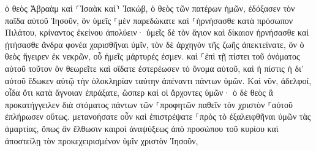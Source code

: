 \documentclass{openreader}
\begin{document}
ὁ θεὸς Ἀβραὰμ καὶ ⸂Ἰσαὰκ καὶ⸃ Ἰακώβ, ὁ θεὸς τῶν πατέρων ἡμῶν, ἐδόξασεν τὸν παῖδα αὐτοῦ Ἰησοῦν, ὃν ὑμεῖς ⸀μὲν παρεδώκατε καὶ ⸀ἠρνήσασθε κατὰ πρόσωπον Πιλάτου, κρίναντος ἐκείνου ἀπολύειν· 
ὑμεῖς δὲ τὸν ἅγιον καὶ δίκαιον ἠρνήσασθε καὶ ᾐτήσασθε ἄνδρα φονέα χαρισθῆναι ὑμῖν, 
τὸν δὲ ἀρχηγὸν τῆς ζωῆς ἀπεκτείνατε, ὃν ὁ θεὸς ἤγειρεν ἐκ νεκρῶν, οὗ ἡμεῖς μάρτυρές ἐσμεν. 
καὶ ⸀ἐπὶ τῇ πίστει τοῦ ὀνόματος αὐτοῦ τοῦτον ὃν θεωρεῖτε καὶ οἴδατε ἐστερέωσεν τὸ ὄνομα αὐτοῦ, καὶ ἡ πίστις ἡ δι’ αὐτοῦ ἔδωκεν αὐτῷ τὴν ὁλοκληρίαν ταύτην ἀπέναντι πάντων ὑμῶν. 
Καὶ νῦν, ἀδελφοί, οἶδα ὅτι κατὰ ἄγνοιαν ἐπράξατε, ὥσπερ καὶ οἱ ἄρχοντες ὑμῶν· 
ὁ δὲ θεὸς ἃ προκατήγγειλεν διὰ στόματος πάντων τῶν ⸀προφητῶν παθεῖν τὸν χριστὸν ⸀αὐτοῦ ἐπλήρωσεν οὕτως. 
μετανοήσατε οὖν καὶ ἐπιστρέψατε ⸀πρὸς τὸ ἐξαλειφθῆναι ὑμῶν τὰς ἁμαρτίας, 
ὅπως ἂν ἔλθωσιν καιροὶ ἀναψύξεως ἀπὸ προσώπου τοῦ κυρίου καὶ ἀποστείλῃ τὸν προκεχειρισμένον ὑμῖν χριστὸν Ἰησοῦν, 
\end{document}
